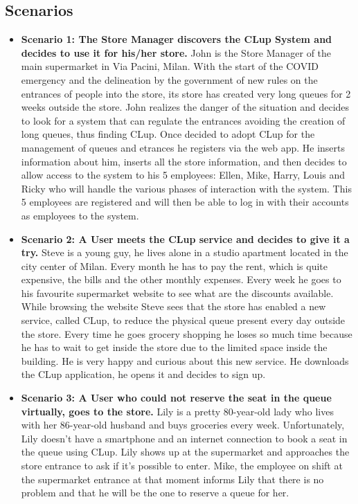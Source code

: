 \subsection{Scenarios}

\begin{itemize}
    \item \textbf{Scenario 1: The Store Manager discovers the CLup System and decides to use it for his/her store.} John is the Store Manager of the main supermarket in Via Pacini, Milan. With the start of the COVID emergency and the delineation by the government of new rules on the entrances of people into the store, its store has created very long queues for 2 weeks outside the store. John realizes the danger of the situation and decides to look for a system that can regulate the entrances avoiding the creation of long queues, thus finding CLup.
    Once decided to adopt CLup for the management of queues and etrances he registers via the web app. He inserts information about him, inserts all the store information, and then decides to allow access to the system to his 5 employees: Ellen, Mike, Harry, Louis and Ricky who will handle the various phases of interaction with the system. This 5 employees are registered and will then be able to log in with their accounts as employees to the system.
    \item \textbf{Scenario 2: A User meets the CLup service and decides to give it a try.} Steve is a young guy, he lives alone in a studio apartment located in the city center of Milan. Every month he has to pay the rent, which is quite expensive, the bills and the other monthly expenses. Every week he goes to his favourite supermarket website to see what are the discounts available. While browsing the website Steve sees that the store has enabled a new service, called CLup, to reduce the physical queue present every day outside the store. 
    Every time he goes grocery shopping he loses so much time because he has to wait to get inside the store due to the limited space inside the building. He is very happy and curious about this new service. He downloads the CLup application, he opens it and decides to sign up.
    \item \textbf{Scenario 3: A User who could not reserve the seat in the queue virtually, goes to the store.} Lily is a pretty 80-year-old lady who lives with her 86-year-old husband and buys groceries every week. Unfortunately, Lily doesn’t have a smartphone and an internet connection to book a seat in the queue using CLup. Lily shows up at the supermarket and approaches the store entrance to ask if it’s possible to enter. Mike, the employee on shift at the supermarket entrance at that moment informs Lily that there is no problem and that he will be the one to reserve a queue for her.

\end{itemize}
